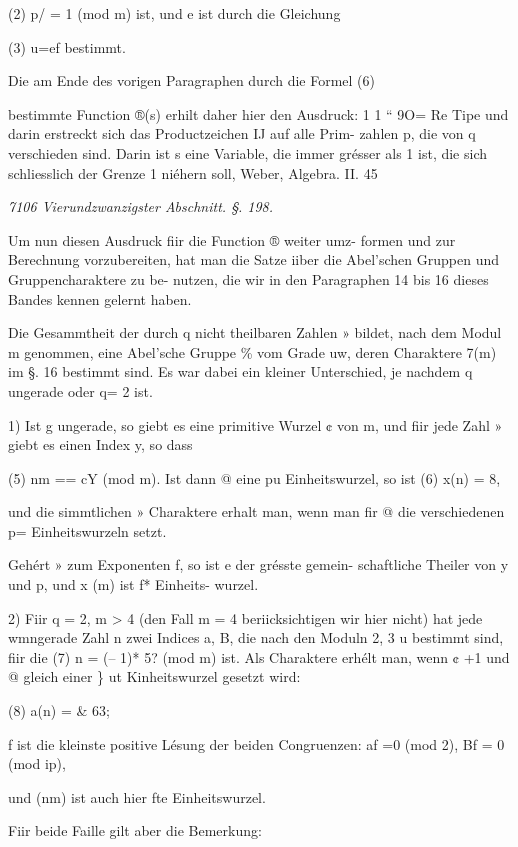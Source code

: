 \documentclass[12pt,a4paper]{article}
\theoremstyle{plain}
\theoremstyle{definition}
\begin{document}
(2) p/ = 1 (mod m) ist, und e ist durch die Gleichung

(3) u=ef bestimmt.

Die am Ende des vorigen Paragraphen durch die Formel (6)

bestimmte Function ®(s) erhilt daher hier den Ausdruck: 1 1 `` 9O= Re Tipe und darin erstreckt sich das Productzeichen IJ auf alle Prim- zahlen p, die von q verschieden sind. Darin ist s eine Variable, die immer grésser als 1 ist, die sich schliesslich der Grenze 1 niéhern soll, Weber, Algebra. II. 45

\vspace{0.5\baselineskip}\noindent\textit{7106 Vierundzwanzigster Abschnitt. §. 198.}\par

Um nun diesen Ausdruck fiir die Function ® weiter umz- formen und zur Berechnung vorzubereiten, hat man die Satze iiber die Abel'schen Gruppen und Gruppencharaktere zu be- nutzen, die wir in den Paragraphen 14 bis 16 dieses Bandes kennen gelernt haben.

Die Gesammtheit der durch q nicht theilbaren Zahlen » bildet, nach dem Modul m genommen, eine Abel'sche Gruppe \% vom Grade uw, deren Charaktere 7(m) im §. 16 bestimmt sind. Es war dabei ein kleiner Unterschied, je nachdem q ungerade oder q= 2 ist.

1) Ist g ungerade, so giebt es eine primitive Wurzel ¢ von m, und fiir jede Zahl » giebt es einen Index y, so dass

(5) nm == cY (mod m). Ist dann @ eine pu Einheitswurzel, so ist (6) x(n) = 8,

und die simmtlichen » Charaktere erhalt man, wenn man fir @ die verschiedenen p= Einheitswurzeln setzt.

Gehért » zum Exponenten f, so ist e der grésste gemein- schaftliche Theiler von y und p, und x (m) ist f* Einheits- wurzel.

2) Fiir q = 2, m > 4 (den Fall m = 4 beriicksichtigen wir hier nicht) hat jede wmngerade Zahl n zwei Indices a, B, die nach den Moduln 2, 3 u bestimmt sind, fiir die (7) n = (-- 1)* 5? (mod m) ist. Als Charaktere erhélt man, wenn ¢ +1 und @ gleich einer \} ut Kinheitswurzel gesetzt wird:

(8) a(n) = \& 63;

f ist die kleinste positive Lésung der beiden Congruenzen: af =0 (mod 2), Bf = 0 (mod ip),

und (nm) ist auch hier fte Einheitswurzel.

Fiir beide Faille gilt aber die Bemerkung:
\end{document}
